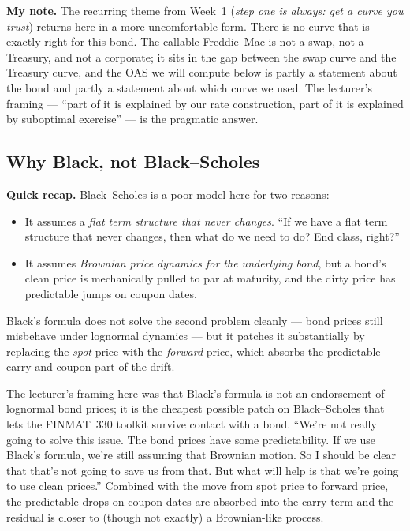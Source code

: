 \begin{checkpoint}
\textbf{My note.} The recurring theme from Week~1 (\emph{step one is
always: get a curve you trust}) returns here in a more uncomfortable
form. There is no curve that is exactly right for this bond. The
callable Freddie~Mac is not a swap, not a Treasury, and not a
corporate; it sits in the gap between the swap curve and the
Treasury curve, and the OAS we will compute below is partly a
statement about the bond and partly a statement about which curve
we used. The lecturer's framing --- ``part of it is explained by our
rate construction, part of it is explained by suboptimal exercise''
--- is the pragmatic answer.
\end{checkpoint}

\subsection{Why Black, not Black--Scholes}\label{L6-sec:freddie-blackvsbs}

\begin{keyblock}
\textbf{Quick recap.} Black--Scholes is a poor model here for two
reasons:
\begin{itemize}
  \item It assumes a \emph{flat term structure that never changes}.
        ``If we have a flat term structure that never changes, then
        what do we need to do? End class, right?''
  \item It assumes \emph{Brownian price dynamics for the underlying
        bond}, but a bond's clean price is mechanically pulled to
        par at maturity, and the dirty price has predictable jumps
        on coupon dates.
\end{itemize}
Black's formula does not solve the second problem cleanly --- bond
prices still misbehave under lognormal dynamics --- but it patches it
substantially by replacing the \emph{spot} price with the \emph{forward}
price, which absorbs the predictable carry-and-coupon part of the
drift.
\end{keyblock}

The lecturer's framing here was that Black's formula is not an
endorsement of lognormal bond prices; it is the cheapest possible
patch on Black--Scholes that lets the FINMAT~330 toolkit survive
contact with a bond. ``We're not really going to solve this issue.
The bond prices have some predictability. If we use Black's formula,
we're still assuming that Brownian motion. So I should be clear that
that's not going to save us from that. But what will help is that
we're going to use clean prices.'' Combined with the move from spot
price to forward price, the predictable drops on coupon dates are
absorbed into the carry term and the residual is closer to (though
not exactly) a Brownian-like process.

